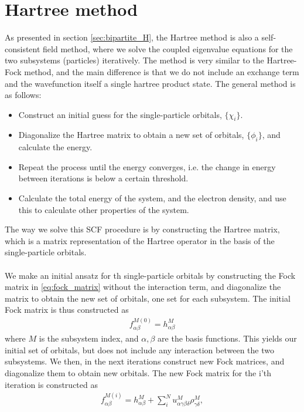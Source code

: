 \documentclass{subfiles}
\begin{document}
\section{Hartree method}
As presented in section \ref{sec:bipartite_H}, the Hartree method is also a self-consistent field method, where we solve the coupled eigenvalue equations for the two subsystems (particles) iteratively. The method is very similar to the Hartree-Fock method, and the main difference is that we do not include an exchange term and the wavefunction itself a single hartree product state. The general method is as follows:
\begin{itemize}
    \item Construct an initial guess for the single-particle orbitals, $\{\chi_i\}$.
    \item Diagonalize the Hartree matrix to obtain a new set of orbitals, $\{\phi_i\}$, and calculate the energy.
    \item Repeat the process until the energy converges, i.e. the change in energy between iterations is below a certain threshold.
    \item Calculate the total energy of the system, and the electron density, and use this to calculate other properties of the system.
\end{itemize}
The way we solve this SCF procedure is by constructing the Hartree matrix, which is a matrix representation of the Hartree operator in the basis of the single-particle orbitals. \\ \\
We make an initial ansatz for th single-particle orbitals by constructing the Fock matrix in \eqref{eq:fock_matrix} without the interaction term, and diagonalize the matrix to obtain the new set of orbitals, one set for each subsystem. The initial Fock matrix is thus constructed as
\begin{align*}
    f_{\alpha\beta}^{M(0)} = h_{\alpha\beta}^M
\end{align*}
where $M$ is the subsystem index, and $\alpha, \beta$ are the basis functions. This yields our initial set of orbitals, but does not include any interaction between the two subsystems. We then, in the next iterations construct new Fock matrices, and diagonalize them to obtain new orbitals. The new Fock matrix for the i'th iteration is constructed as
\begin{align*}
    f_{\alpha\beta}^{M(i)} = h_{\alpha\beta}^M + \sum_{i}^{N} u_{\alpha\gamma\beta\delta}^{M} \rho_{\gamma\delta}^{M},
\end{align*}
\end{document}
